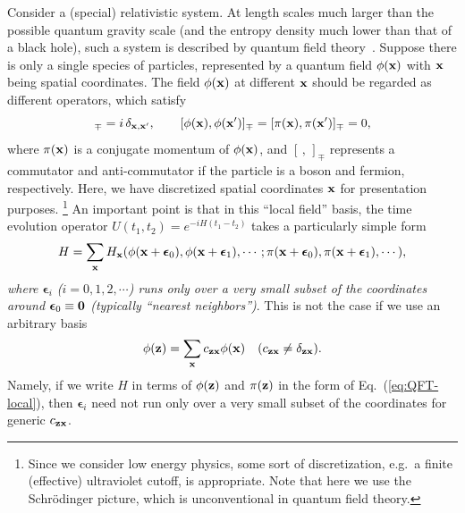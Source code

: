\documentclass[12pt]{article}
\begin{document}
Consider a (special) relativistic system.  At length scales much larger 
than the possible quantum gravity scale (and the entropy density much 
lower than that of a black hole), such a system is described by quantum 
field theory~\cite{Weinberg:QFT}.  Suppose there is only a single species 
of particles, represented by a quantum field $\phi({\bf x})$ with ${\bf x}$ 
being spatial coordinates.  The field $\phi({\bf x})$ at different 
${\bf x}$ should be regarded as different operators, which satisfy
%
\begin{equation}
  [ \phi({\bf x}), \pi({\bf x'}) ]_\mp = i\, \delta_{{\bf x},{\bf x'}},
\qquad
  [ \phi({\bf x}), \phi({\bf x'}) ]_\mp 
  = [ \pi({\bf x}), \pi({\bf x'}) ]_\mp = 0,
\label{eq:QFT-algebra}
\end{equation}
%
where $\pi({\bf x})$ is a conjugate momentum of $\phi({\bf x})$, and 
$[\, ,\, ]_\mp$ represents a commutator and anti-commutator if the particle 
is a boson and fermion, respectively.  Here, we have discretized spatial 
coordinates ${\bf x}$ for presentation purposes.%
\footnote{Since we consider low energy physics, some sort of discretization, 
 e.g.\ a finite (effective) ultraviolet cutoff, is appropriate.  Note 
 that here we use the Schr\"{o}dinger picture, which is unconventional 
 in quantum field theory.}
An important point is that in this ``local field'' basis, the time evolution 
operator $U(t_1,t_2) = e^{-iH(t_1-t_2)}$ takes a particularly simple form
%
\begin{equation}
  H = \sum_{\bf x}
    H_{\bf x}(\phi({\bf x}+\boldsymbol\epsilon_0),
      \phi({\bf x}+\boldsymbol\epsilon_1),\cdots; 
    \pi({\bf x}+\boldsymbol\epsilon_0),
      \pi({\bf x}+\boldsymbol\epsilon_1),\cdots),
\label{eq:QFT-local}
\end{equation}
%
{\it where $\boldsymbol\epsilon_i$ ($i = 0,1,2,\cdots$) runs only over 
a very small subset of the coordinates around $\boldsymbol\epsilon_0 
\equiv {\bf 0}$ (typically ``nearest neighbors'')}.  This is not the case 
if we use an arbitrary basis
%
\begin{equation}
  \phi({\bf z}) = \sum_{\bf x} c_{{\bf z} {\bf x}} \phi({\bf x}) 
\quad
  (c_{{\bf z} {\bf x}} \neq \delta_{{\bf z} {\bf x}}).
\label{eq:QFT-another}
\end{equation}
%
Namely, if we write $H$ in terms of $\phi({\bf z})$ and $\pi({\bf z})$ 
in the form of Eq.~(\ref{eq:QFT-local}), then $\boldsymbol\epsilon_i$ 
need not run only over a very small subset of the coordinates for 
generic $c_{{\bf z} {\bf x}}$.
\end{document}

